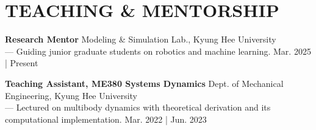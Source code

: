 \documentclass[a4paper,10pt]{extarticle}
\begin{document}
\section*{TEACHING \& MENTORSHIP}
\textbf{Research Mentor} \hfill Modeling \& Simulation Lab., Kyung Hee University\\
--- {\footnotesize{Guiding junior graduate students on robotics and machine learning.}} \hfill Mar. 2025 | Present\\ %
\vspace*{-0.2cm}

\noindent
\textbf{Teaching Assistant, ME380 Systems Dynamics} \hfill Dept. of Mechanical Engineering, Kyung Hee University\\
--- {\footnotesize{Lectured on multibody dynamics with theoretical derivation and its computational implementation.}} \hfill Mar. 2022 | Jun. 2023 %


\end{document}
